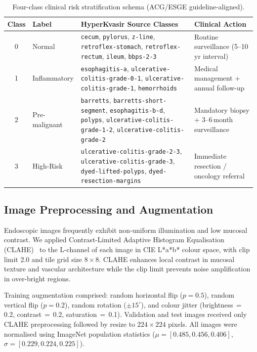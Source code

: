 \documentclass[10pt,a4paper,twocolumn]{article}
\begin{document}
\begin{table}[htbp]
\centering
\caption{Four-class clinical risk stratification schema (ACG/ESGE
  guideline-aligned).}
\label{tab:schema}
\begin{tabular}{clp{4.2cm}p{4.2cm}}
\toprule
\textbf{Class} & \textbf{Label} & \textbf{HyperKvasir Source Classes} &
\textbf{Clinical Action}\\
\midrule
0 & Normal &
  \texttt{cecum}, \texttt{pylorus}, \texttt{z-line},
  \texttt{retroflex-stomach}, \texttt{retroflex-rectum}, \texttt{ileum},
  \texttt{bbps-2-3} &
  Routine surveillance (5--10\,yr interval)\\[4pt]
1 & Inflammatory &
  \texttt{esophagitis-a}, \texttt{ulcerative-colitis-grade-0-1},
  \texttt{ulcerative-colitis-grade-1}, \texttt{hemorrhoids} &
  Medical management + annual follow-up\\[4pt]
2 & Pre-malignant &
  \texttt{barretts}, \texttt{barretts-short-segment},
  \texttt{esophagitis-b-d}, \texttt{polyps},
  \texttt{ulcerative-colitis-grade-1-2},
  \texttt{ulcerative-colitis-grade-2} &
  Mandatory biopsy + 3--6\,month surveillance\\[4pt]
3 & High-Risk &
  \texttt{ulcerative-colitis-grade-2-3},
  \texttt{ulcerative-colitis-grade-3},
  \texttt{dyed-lifted-polyps},
  \texttt{dyed-resection-margins} &
  Immediate resection / oncology referral\\
\bottomrule
\end{tabular}
\end{table}

\subsection{Image Preprocessing and Augmentation}
\label{sec:preproc}

Endoscopic images frequently exhibit non-uniform illumination and low mucosal
contrast. We applied Contrast-Limited Adaptive Histogram Equalisation
(CLAHE)~\citep{Reza2004} to the L-channel of each image in CIE L*a*b* colour
space, with clip limit 2.0 and tile grid size $8\times8$. CLAHE enhances
local contrast in mucosal texture and vascular architecture while the clip
limit prevents noise amplification in over-bright regions.

Training augmentation comprised: random horizontal flip ($p=0.5$), random
vertical flip ($p=0.2$), random rotation ($\pm15^{\circ}$), and colour
jitter (brightness\,$=$\,0.2, contrast\,$=$\,0.2, saturation\,$=$\,0.1).
Validation and test images received only CLAHE preprocessing followed by
resize to $224\times224$ pixels. All images were normalised using ImageNet
population statistics ($\mu=[0.485, 0.456, 0.406]$,
$\sigma=[0.229, 0.224, 0.225]$).
\end{document}
